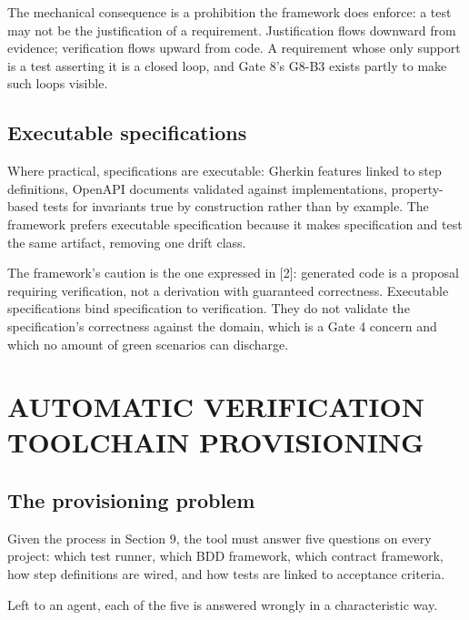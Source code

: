\documentclass[11pt,a4paper]{article}
\begin{document}
The mechanical consequence is a prohibition the framework does enforce: a test may not be the justification of a requirement. Justification flows downward from evidence; verification flows upward from code. A requirement whose only support is a test asserting it is a closed loop, and Gate 8's G8-B3 exists partly to make such loops visible.

\subsection{Executable specifications}

Where practical, specifications are executable: Gherkin features linked to step definitions, OpenAPI documents validated against implementations, property-based tests for invariants true by construction rather than by example. The framework prefers executable specification because it makes specification and test the same artifact, removing one drift class.

The framework's caution is the one expressed in [2]: generated code is a proposal requiring verification, not a derivation with guaranteed correctness. Executable specifications bind specification to verification. They do not validate the specification's correctness against the domain, which is a Gate 4 concern and which no amount of green scenarios can discharge.

\section{AUTOMATIC VERIFICATION TOOLCHAIN PROVISIONING}

\subsection{The provisioning problem}

Given the process in Section 9, the tool must answer five questions on every project: which test runner, which BDD framework, which contract framework, how step definitions are wired, and how tests are linked to acceptance criteria.

Left to an agent, each of the five is answered wrongly in a characteristic way.
\end{document}
